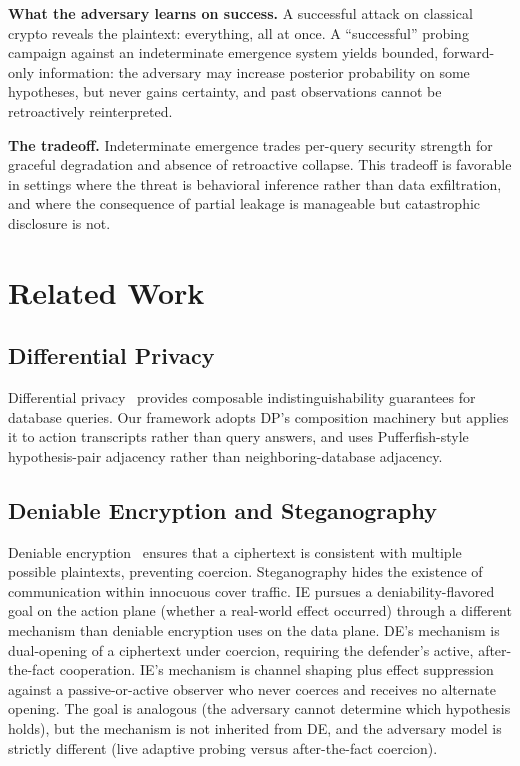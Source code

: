 \documentclass[11pt,a4paper]{article}
\begin{document}
\textbf{What the adversary learns on success.} A successful attack on classical crypto reveals the plaintext: everything, all at once. A ``successful'' probing campaign against an indeterminate emergence system yields bounded, forward-only information: the adversary may increase posterior probability on some hypotheses, but never gains certainty, and past observations cannot be retroactively reinterpreted.

\textbf{The tradeoff.} Indeterminate emergence trades per-query security strength for graceful degradation and absence of retroactive collapse. This tradeoff is favorable in settings where the threat is behavioral inference rather than data exfiltration, and where the consequence of partial leakage is manageable but catastrophic disclosure is not.

\section{Related Work}

\subsection{Differential Privacy}

Differential privacy~\cite{dwork2006calibrating} provides composable indistinguishability guarantees for database queries. Our framework adopts DP's composition machinery but applies it to action transcripts rather than query answers, and uses Pufferfish-style~\cite{kifer2014pufferfish} hypothesis-pair adjacency rather than neighboring-database adjacency.

\subsection{Deniable Encryption and Steganography}

Deniable encryption~\cite{canetti1997deniable} ensures that a ciphertext is consistent with multiple possible plaintexts, preventing coercion. Steganography hides the existence of communication within innocuous cover traffic. IE pursues a deniability-flavored goal on the action plane (whether a real-world effect occurred) through a different mechanism than deniable encryption uses on the data plane. DE's mechanism is dual-opening of a ciphertext under coercion, requiring the defender's active, after-the-fact cooperation. IE's mechanism is channel shaping plus effect suppression against a passive-or-active observer who never coerces and receives no alternate opening. The goal is analogous (the adversary cannot determine which hypothesis holds), but the mechanism is not inherited from DE, and the adversary model is strictly different (live adaptive probing versus after-the-fact coercion).
\end{document}
